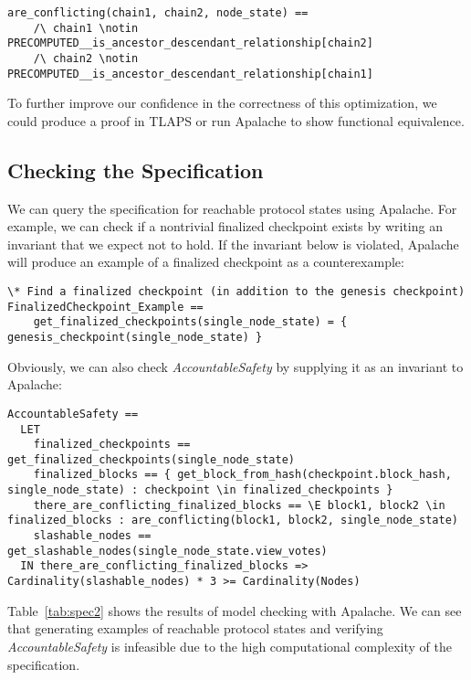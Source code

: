 \begin{lstlisting}[language=tla]
are_conflicting(chain1, chain2, node_state) ==
    /\ chain1 \notin PRECOMPUTED__is_ancestor_descendant_relationship[chain2]
    /\ chain2 \notin PRECOMPUTED__is_ancestor_descendant_relationship[chain1]
\end{lstlisting}

To further improve our confidence in the correctness of this optimization, we
could produce a proof in TLAPS or run Apalache to show functional equivalence.

\subsection{Checking the Specification}

We can query the specification for reachable protocol states using Apalache.
For example, we can check if a nontrivial finalized checkpoint exists by writing an
invariant that we expect not to hold. If the invariant below is violated,
Apalache will produce an example of a finalized checkpoint as a counterexample:

\begin{lstlisting}[language=tla]
\* Find a finalized checkpoint (in addition to the genesis checkpoint)
FinalizedCheckpoint_Example ==
    get_finalized_checkpoints(single_node_state) = { genesis_checkpoint(single_node_state) }
\end{lstlisting}

Obviously, we can also check \textit{AccountableSafety} by supplying it as an
invariant to Apalache:

\begin{lstlisting}[language=tla]
AccountableSafety ==
  LET
    finalized_checkpoints == get_finalized_checkpoints(single_node_state)
    finalized_blocks == { get_block_from_hash(checkpoint.block_hash, single_node_state) : checkpoint \in finalized_checkpoints }
    there_are_conflicting_finalized_blocks == \E block1, block2 \in finalized_blocks : are_conflicting(block1, block2, single_node_state)
    slashable_nodes == get_slashable_nodes(single_node_state.view_votes)
  IN there_are_conflicting_finalized_blocks => Cardinality(slashable_nodes) * 3 >= Cardinality(Nodes)
\end{lstlisting}

Table~\ref{tab:spec2} shows the results of model checking \SpecTwo{} with
Apalache. We can see that generating examples of reachable protocol states and
verifying \textit{AccountableSafety} is infeasible due to the high computational
complexity of the specification.

